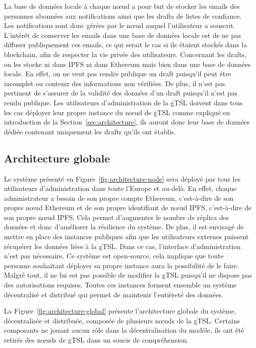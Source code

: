 \documentclass{tnreport}
\begin{document}
La base de données locale à chaque nœud a pour but de stocker les emails des personnes abonnées aux notifications ainsi que les drafts de listes de confiance. Les notifications sont donc gérées par le nœud auquel l'utilisateur a souscrit. L'intérêt de conserver les emails dans une base de données locale est de ne pas diffuser publiquement ces emails, ce qui serait le cas si ils étaient stockés dans la blockchain, afin de respecter la vie privée des utilisateurs. Concernant les drafts, on les stocke ni dans IPFS ni dans Ethereum mais bien dans une base de données locale. En effet, on ne veut pas rendre publique un draft puisqu'il peut être incomplet ou contenir des informations non vérifiées. De plus, il n'est pas pertinent de s'assurer de la validité des données d'un draft puisqu'il n'est pas rendu publique. Les utilisateurs d'administration de la gTSL doivent dans tous les cas déployer leur propre instance du nœud de gTSL comme expliqué en introduction de la Section~\ref{sec:architecture}, ils auront donc leur base de données dédiée contenant uniquement les drafts qu'ils ont établis.

\subsection{Architecture globale}

Le système présenté en Figure~\ref{fig:architecture-node} sera déployé par tous les utilisateurs d'administration dans toute l'Europe et au-delà. En effet, chaque administrateur a besoin de son propre compte Ethereum, c'est-à-dire de son propre nœud Ethereum et de son propre identifiant de nœud IPFS, c'est-à-dire de son propre nœud IPFS. Cela permet d'augmenter le nombre de réplica des données et donc d'améliorer la résilience du système. De plus, il est envisagé de mettre en place des instances publiques afin que les utilisateurs externes puissent récupérer les données liées à la gTSL. Dans ce cas, l'interface d'administration n'est pas nécessaire. Ce système est open-source, cela implique que toute personne souhaitant déployer sa propre instance aura la possibilité de le faire. Malgré tout, il ne lui est pas possible de modifier la gTSL puisqu'il ne dispose pas des autorisations requises. Toutes ces instances forment ensemble un système décentralisé et distribué qui permet de maintenir l'entièreté des données. 

La Figure~\ref{fig:architecture-global} présente l'architecture globale du système, décentralisée et distribuée, composée de plusieurs nœuds de la gTSL. Certains composants ne jouant aucun rôle dans la décentralisation du modèle, ils ont été retirés des nœuds de gTSL dans un soucis de compréhension.
\clearpage
\end{document}
